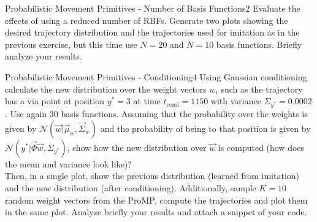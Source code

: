 \begin{questions}

\begin{question}[bonus]{Probabilistic Movement Primitives - Number of Basis Functions}{2}
Evaluate the effects of using a reduced number of RBFs. Generate two plots showing the desired trajectory distribution and the trajectories used for imitation as in the previous exercise, but this time use $N=20$ and $N=10$ basis functions. Briefly analyze your results.

\begin{answer}\end{answer}

\end{question}



\begin{question}[bonus]{Probabilistic Movement Primitives - Conditioning}{4}
Using Gaussian conditioning calculate the new distribution over the weight vectors $w_i$ such as the trajectory has a via point at position $y^*=3$ at time $t_\textrm{cond}=1150$ with variance $\Sigma_{y^*}=0.0002$. Use again 30 basis functions.
Assuming that the probability over the weights is given by $\mathcal{N}(\vec w|\vec \mu_w,\vec \Sigma_w)$ and the probability of being to that position is given by $\mathcal{N}(y^*|\vec \Phi \vec w, \Sigma_{y^*} )$, show how the new distribution over $\vec w$ is computed (how does the mean and variance look like)?
\\
Then, in a single plot, show the previous distribution (learned from imitation) and the new distribution (after conditioning). Additionally, sample $K=10$ random weight vectors from the ProMP, compute the trajectories and plot them in the same plot. Analyze briefly your results and attach a snippet of your code.

\begin{answer}\end{answer}

\end{question}

\end{questions}
